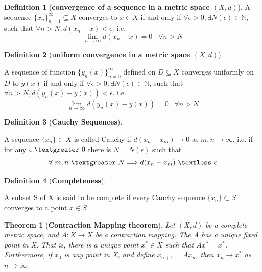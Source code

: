 \documentclass{article}
\newtheorem{theorem}{Theorem}[section]
\theoremstyle{definition}
\newtheorem{definition}{Definition}[section]
\theoremstyle{remark}
\begin{document}
\begin{definition}[\textbf{convergence of a sequence in a metric space $(X,d)$}]\label{def:ConvMetric}
    A sequence $\{x_n\}_{n=1}^{\infty} \subseteq X$ converges to $x \in X$ if and only if $\forall \epsilon > 0, \exists N(\epsilon) \in \mathbb{N}$, such that $\forall n > N, d(x_n - x) < \epsilon$. i.e. 
    \begin{equation}\label{eqn:ConvMetric}
        \lim_{n \to \infty}{d(x_n - x) = 0} \;\;\; \forall n > N
    \end{equation}
\end{definition}

\begin{definition}[\textbf{uniform convergence in a metric space $(X,d)$}]\label{def:uniConvMetric}

    A sequence of function $\{y_n(x)\}_{n = 0}^{\infty}$ defined on $D \subseteq X$ converges uniformly on $D$ to $y(x)$ if and only if $\forall \epsilon > 0, \exists N(\epsilon) \in \mathbb{N}$, such that $\forall n > N, d(y_n(x) - y(x)) < \epsilon$. i.e.
        \begin{equation}
            \lim_{n \to \infty}{d(y_n(x) - y(x))} = 0 \;\;\; \forall n > N
        \end{equation}
\end{definition}

\begin{definition}[\textbf{Cauchy Sequences}]\label{def:cauchySeq}

    A sequence $\{x_n\} \subset X$ is called Cauchy if $d(x_n - x_m) \rightarrow 0$ as $m,n \rightarrow \infty$, i.e. if for any $\epsilon \ \textgreater\ 0$ there is $N = N(\epsilon)$ such that
        \begin{equation}
            \forall\ m,n\ \textgreater\ N \Longrightarrow d(x_n - x_m)\ \textless \ \epsilon
        \end{equation}
\end{definition}

\begin{definition}[\textbf{Completeness}]\label{def:completeness}

    A subset S of X is said to be complete if every Cauchy sequence $\{x_n\} \subset S$ converges to a point $x \in S$
\end{definition}

\begin{theorem}[\textbf{Contraction Mapping theorem}]\label{thm:CMT}
    Let $(X,d)$ be a complete metric space, and $A:X\rightarrow X$ be a contraction mapping. The A has a unique fixed point in X. That is, there is a unique point $x^*\in X$ such that $Ax^* = x^*$. Furthermore, if $x_0$ is any point in X, and define $x_{n+1} = Ax_n$, then $x_n \rightarrow x^*$ as $n \rightarrow \infty$.
\end{theorem}

\newpage

\newpage


\end{document}
